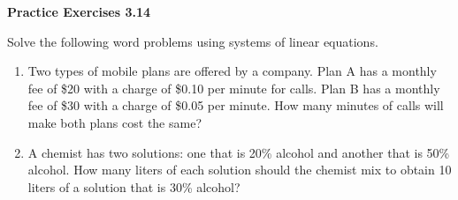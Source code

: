  \vspace{.3ex}
\noindent\textbf{Practice Exercises 3.14}

\vspace{0.2ex}


Solve the following word problems using systems of linear equations.
\begin{enumerate}[noitemsep, label = \color{blue}\arabic*. ]
    
    
    
    
    
    \item Two types of mobile plans are offered by a company. Plan A has a monthly fee of \$20 with a charge of \$0.10 per minute for calls. Plan B has a monthly fee of \$30 with a charge of \$0.05 per minute. How many minutes of calls will make both plans cost the same?
    
    \item A chemist has two solutions: one that is 20\% alcohol and another that is 50\% alcohol. How many liters of each solution should the chemist mix to obtain 10 liters of a solution that is 30\% alcohol?
    

\end{enumerate}
